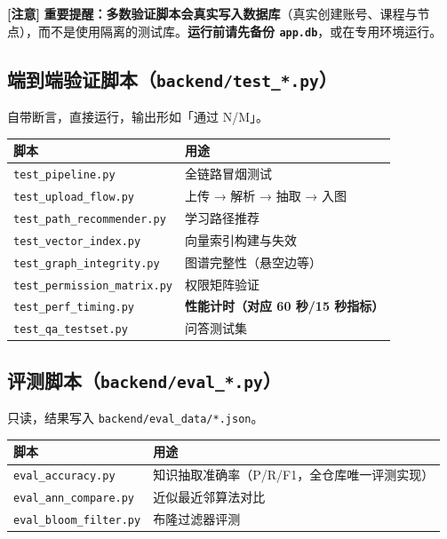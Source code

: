 \documentclass[UTF8,a4paper,11pt]{ctexrep}
\newcommand{\warnmark}{\textcolor{todobar}{\textbf{[注意]}}}
\begin{document}
\begin{todobox}
\warnmark{} \textbf{重要提醒：多数验证脚本会真实写入数据库}（真实创建账号、课程与节点），而不是使用隔离的测试库。\textbf{运行前请先备份 \texttt{app.db}}，或在专用环境运行。

\end{todobox}


\subsection*{端到端验证脚本（\texttt{backend/test\_*.py}）}

自带断言，直接运行，输出形如「通过 N/M」。

\begin{center}
\small
\begin{tabularx}{\linewidth}{@{}XX@{}}
\toprule
脚本 & 用途 \\
\midrule
\texttt{test\_pipeline.py} & 全链路冒烟测试 \\
\texttt{test\_upload\_flow.py} & 上传 → 解析 → 抽取 → 入图 \\
\texttt{test\_path\_recommender.py} & 学习路径推荐 \\
\texttt{test\_vector\_index.py} & 向量索引构建与失效 \\
\texttt{test\_graph\_integrity.py} & 图谱完整性（悬空边等） \\
\texttt{test\_permission\_matrix.py} & 权限矩阵验证 \\
\texttt{test\_perf\_timing.py} & \textbf{性能计时（对应 60 秒/15 秒指标）} \\
\texttt{test\_qa\_testset.py} & 问答测试集 \\
\bottomrule
\end{tabularx}
\end{center}

\subsection*{评测脚本（\texttt{backend/eval\_*.py}）}

只读，结果写入 \texttt{backend/eval\_data/*.json}。

\begin{center}
\small
\begin{tabularx}{\linewidth}{@{}XX@{}}
\toprule
脚本 & 用途 \\
\midrule
\texttt{eval\_accuracy.py} & 知识抽取准确率（P/R/F1，全仓库唯一评测实现） \\
\texttt{eval\_ann\_compare.py} & 近似最近邻算法对比 \\
\texttt{eval\_bloom\_filter.py} & 布隆过滤器评测 \\
\bottomrule
\end{tabularx}
\end{center}
\end{document}
